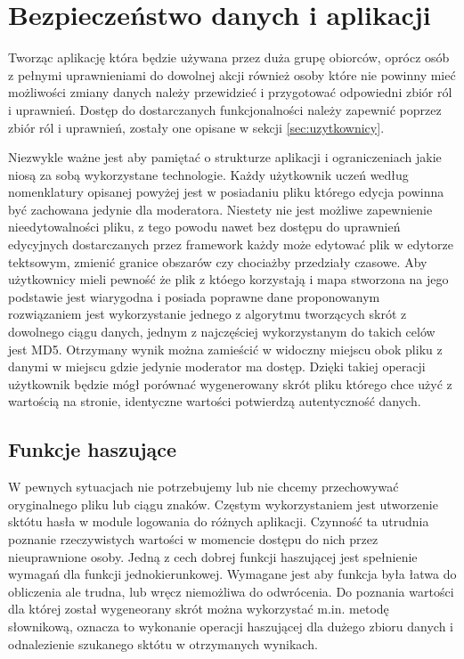 \clearpage
\newpage
\section{Bezpieczeństwo danych i aplikacji}
\label{sec:bezpieczenstwo}

Tworząc aplikację która będzie używana przez duża grupę obiorców, oprócz osób z pełnymi uprawnieniami do dowolnej akcji również osoby które nie powinny mieć możliwości zmiany danych należy przewidzieć i przygotować odpowiedni zbiór ról i uprawnień. Dostęp do dostarczanych funkcjonalności należy zapewnić poprzez zbiór ról i uprawnień, zostały one opisane w sekcji \ref{sec:uzytkownicy}.

Niezwykle ważne jest aby pamiętać o strukturze aplikacji i ograniczeniach jakie niosą za sobą wykorzystane technologie. Każdy użytkownik uczeń według nomenklatury opisanej powyżej jest w posiadaniu pliku którego edycja powinna być zachowana jedynie dla moderatora. Niestety nie jest możliwe zapewnienie nieedytowalności pliku, z tego powodu nawet bez dostępu do uprawnień edycyjnych dostarczanych przez framework każdy może edytować plik w edytorze tektsowym, zmienić granice obszarów czy chociażby przedziały czasowe. Aby użytkownicy mieli pewność że plik z któego korzystają i mapa stworzona na jego podstawie jest wiarygodna i posiada poprawne dane proponowanym rozwiązaniem jest wykorzystanie jednego z algorytmu tworzących skrót z dowolnego ciągu danych, jednym z najczęściej wykorzystanym do takich celów jest MD5. Otrzymany wynik można zamieścić w widoczny miejscu obok pliku z danymi w miejscu gdzie jedynie moderator ma dostęp. Dzięki takiej operacji użytkownik będzie mógł porównać wygenerowany skrót pliku którego chce użyć z wartością na stronie, identyczne wartości potwierdzą autentyczność danych.

\subsection{Funkcje haszujące}
\label{sec:hashfunction}

W pewnych sytuacjach nie potrzebujemy lub nie chcemy przechowywać oryginalnego pliku lub ciągu znaków. Częstym wykorzystaniem jest utworzenie sktótu hasła w module logowania do różnych aplikacji. Czynność ta utrudnia poznanie rzeczywistych wartości w momencie dostępu do nich przez nieuprawnione osoby. Jedną z cech dobrej funkcji haszującej jest
spełnienie wymagań dla funkcji jednokierunkowej. Wymagane jest aby funkcja była łatwa do obliczenia ale trudna, lub wręcz niemożliwa do odwrócenia.
Do poznania wartości dla której został wygeneorany skrót można wykorzystać m.in. metodę słownikową, oznacza to wykonanie operacji haszującej dla dużego zbioru danych i odnalezienie szukanego sktótu w otrzymanych wynikach.

